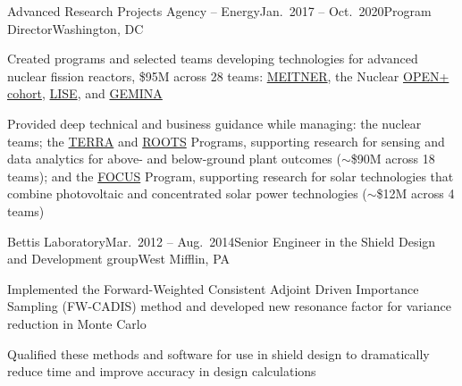 
\begin{rSubsection}{Advanced Research Projects Agency -- Energy}{Jan.\ 2017 -- Oct.\ 2020}{Program Director}{Washington, DC}
\item Created programs and selected teams developing technologies for advanced nuclear fission reactors, \$95M across 28 teams: 
\href{https://arpa-e.energy.gov/?q=arpa-e-programs/meitner}{MEITNER}, the
Nuclear
\href{https://arpa-e.energy.gov/?q=news-item/arpa-e-announces-12-million-five-projects-nuclear-materials-science}{OPEN+
cohort},
\href{https://arpa-e.energy.gov/?q=news-item/arpa-e-innovating-through-unconventional-ideas}{LISE}, and  \href{https://arpa-e.energy.gov/technologies/programs/gemina}{GEMINA}
\item Provided deep technical and business guidance while managing: the nuclear teams; the \href{https://arpa-e.energy.gov/?q=arpa-e-programs/terra}{TERRA} and \href{https://arpa-e.energy.gov/?q=arpa-e-programs/roots}{ROOTS} Programs, supporting research for sensing and data analytics for above- and below-ground plant outcomes ($\sim$\$90M across 18 teams); and the \href{https://arpa-e.energy.gov/?q=arpa-e-programs/focus}{FOCUS} Program, supporting research for solar technologies that combine photovoltaic and concentrated solar power technologies ($\sim$\$12M across 4 teams)
\end{rSubsection}


\begin{rSubsection}{Bettis Laboratory}{Mar.\ 2012 -- Aug.\ 2014}{Senior Engineer in the Shield Design and Development group}{West Mifflin, PA}
\item Implemented the Forward-Weighted Consistent Adjoint Driven Importance Sampling (FW-CADIS) method and developed new resonance factor for variance reduction in Monte Carlo
\item Qualified these methods and software for use in shield design to dramatically reduce time and improve accuracy in design calculations
\end{rSubsection}

